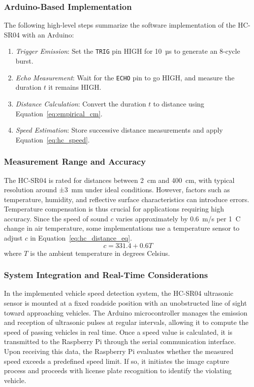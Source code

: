 \subsubsection{Arduino-Based Implementation}
The following high-level steps summarize the software implementation of the HC-SR04 with an Arduino:
\begin{enumerate}
  \item \textit{Trigger Emission}: Set the \texttt{TRIG} pin HIGH for 10~µs to generate an 8-cycle burst.
  \item \textit{Echo Measurement}: Wait for the \texttt{ECHO} pin to go HIGH, and measure the duration $t$ it remains HIGH.
  \item \textit{Distance Calculation}: Convert the duration $t$ to distance using Equation~\ref{eq:empirical_cm}.
  \item \textit{Speed Estimation}: Store successive distance measurements and apply Equation~\ref{eq:hc_speed}.
\end{enumerate}

\subsubsection{Measurement Range and Accuracy}
The HC-SR04 is rated for distances between 2~cm and 400~cm, with typical resolution around ±3~mm under ideal conditions. However, factors such as temperature, humidity, and reflective surface characteristics can introduce errors. Temperature compensation is thus crucial for applications requiring high accuracy. Since the speed of sound $c$ varies approximately by 0.6~m/s per 1~\textdegree C change in air temperature, some implementations use a temperature sensor to adjust $c$ in Equation~\ref{eq:hc_distance_eq}.
\begin{equation}
  c = 331.4 + 0.6T
  \label{eq:temp_compensation}
\end{equation}
where $T$ is the ambient temperature in degrees Celsius.

\subsubsection*{System Integration and Real-Time Considerations}
In the implemented vehicle speed detection system, the HC-SR04 ultrasonic sensor is mounted at a fixed roadside position with an unobstructed line of sight toward approaching vehicles. The Arduino microcontroller manages the emission and reception of ultrasonic pulses at regular intervals, allowing it to compute the speed of passing vehicles in real time. Once a speed value is calculated, it is transmitted to the Raspberry Pi through the serial communication interface. Upon receiving this data, the Raspberry Pi evaluates whether the measured speed exceeds a predefined speed limit. If so, it initiates the image capture process and proceeds with license plate recognition to identify the violating vehicle.

